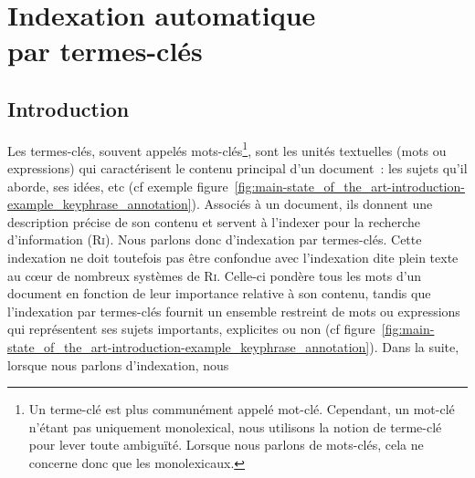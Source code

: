 \chapter[Indexation automatique par termes-clés]{Indexation automatique\\par termes-clés}
\label{chap:main-state_of_the_art}

  \section{Introduction}
  \label{sec:main-state_of_the_art-introduction}
    Les termes-clés,
    souvent appelés mots-clés\footnote{Un terme-clé est plus communément appelé
    mot-clé. Cependant, un mot-clé n'étant pas uniquement monolexical, nous
    utilisons la notion de terme-clé pour lever toute ambiguïté. Lorsque nous parlons de mots-clés, cela ne concerne donc que les
    monolexicaux.}, sont les unités textuelles (mots ou expressions) qui
    caractérisent le contenu principal d'un document~: les sujets qu'il aborde,
    ses idées, etc (cf exemple
    figure~\ref{fig:main-state_of_the_art-introduction-example_keyphrase_annotation}).
    Associés à un document, ils donnent une description précise de son contenu
    et servent à l'indexer pour la recherche d'information (\textsc{Ri}). Nous
    parlons donc d'indexation par termes-clés. Cette indexation ne doit toutefois pas être confondue
    avec l'indexation dite \og{}plein texte\fg{} au c\oe{}ur de nombreux
    systèmes de \textsc{Ri}. Celle-ci pondère tous les mots d'un document en
    fonction de leur importance relative à son contenu, tandis que l'indexation
    par termes-clés fournit un ensemble restreint de mots ou expressions qui
    représentent ses sujets importants, explicites ou non (cf figure~\ref{fig:main-state_of_the_art-introduction-example_keyphrase_annotation}). Dans la suite, lorsque nous parlons d'indexation, nous
